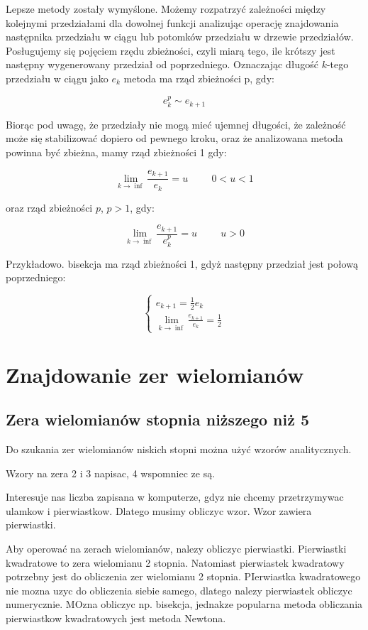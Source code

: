 \documentclass[11pt,a4paper,oneside]{report}
\begin{document}
Lepsze metody zostały wymyślone. Możemy rozpatrzyć zależności między kolejnymi przedziałami dla dowolnej funkcji analizując operację znajdowania następnika przedziału w ciągu lub potomków przedziału w drzewie przedziałów. Posługujemy się pojęciem rzędu zbieżności, czyli miarą tego, ile krótszy jest następny wygenerowany przedział od poprzedniego. Oznaczając długość $k$-tego przedziału w ciągu jako $e_k$ metoda ma rząd zbieżności p, gdy:

$$e_k^p \sim e_{k+1}$$

Biorąc pod uwagę, że przedziały nie mogą mieć ujemnej długości, że zależność może się stabilizować dopiero od pewnego kroku, oraz że analizowana metoda powinna być zbieżna, mamy rząd zbieżności 1 gdy:

$$\lim_{k \rightarrow \inf}\frac{e_{k+1}}{e_k} = u\hspace{1cm}0<u<1$$

oraz rząd zbieżności $p$, $p>1$, gdy:

$$\lim_{k\rightarrow\inf}\frac{e_{k+1}}{e_k^p} = u\hspace{1cm}u>0$$

Przykładowo. bisekcja ma rząd zbieżności 1, gdyż następny przedział jest połową poprzedniego:

\begin{equation}
\begin{cases}
e_{k+1}=\frac{1}{2}e_k \\
\lim_{k \rightarrow \inf}\frac{e_{k+1}}{e_k}=\frac{1}{2}
\end{cases}
\end{equation}

\section{Znajdowanie zer wielomianów}

\subsection{Zera wielomianów stopnia niższego niż 5}

Do szukania zer wielomianów niskich stopni można użyć wzorów analitycznych. 

Wzory na zera 2 i 3 napisac, 4 wspomniec ze są.

Interesuje nas liczba zapisana w komputerze, gdyz nie chcemy przetrzymywac ulamkow i pierwiastkow. Dlatego musimy obliczyc wzor. Wzor zawiera pierwiastki.

Aby operować na zerach wielomianów, nalezy obliczyc pierwiastki. Pierwiastki kwadratowe to zera wielomianu 2 stopnia. Natomiast pierwiastek kwadratowy potrzebny jest do obliczenia zer wielomianu 2 stopnia. PIerwiastka kwadratowego nie mozna uzyc do obliczenia siebie samego, dlatego nalezy pierwiastek obliczyc numerycznie. MOzna obliczyc np. bisekcja, jednakze popularna metoda obliczania pierwiastkow kwadratowych jest metoda Newtona.
\end{document}
